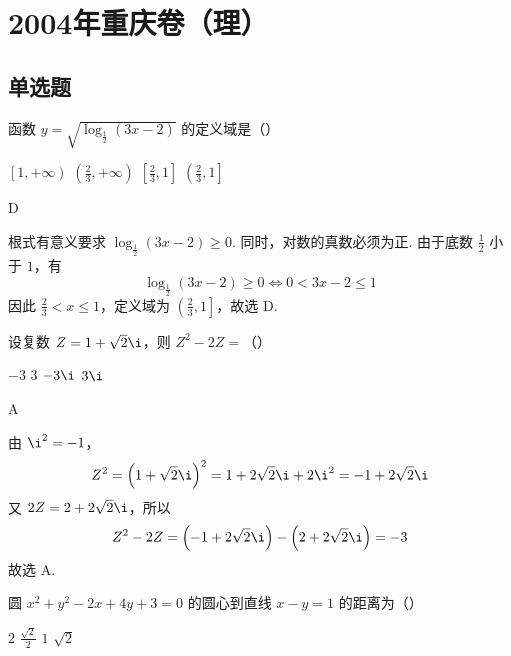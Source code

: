 
\chapter{2004年重庆卷（理）}
\section{单选题}
\begin{problem}
函数 \(y=\sqrt{\log_{\frac{1}{2}}(3x-2)}\) 的定义域是（\quad）

\choices
    {\(\left[1,+\infty\right)\)}
    {\(\left(\frac{2}{3},+\infty\right)\)}
    {\(\left[\frac{2}{3},1\right]\)}
    {\(\left(\frac{2}{3},1\right]\)}
\end{problem}

\begin{answer}
D
\end{answer}

\begin{solution}
根式有意义要求 \(\log_{\frac{1}{2}}(3x-2)\geqslant0\). 同时，对数的真数必须为正. 由于底数 \(\frac{1}{2}\) 小于 \(1\)，有
\[
\log_{\frac{1}{2}}(3x-2)\geqslant0\Longleftrightarrow 0<3x-2\leqslant1\]
因此 \(\frac{2}{3}<x\leqslant1\)，定义域为 \(\left(\frac{2}{3},1\right]\)，故选 D.
\end{solution}

\begin{problem}
设复数 \(Z=1+\sqrt{2}\i\)，则 \(Z^2-2Z=\)（\quad）

\choices
    {\(-3\)}
    {\(3\)}
    {\(-3\i\)}
    {\(3\i\)}
\end{problem}

\begin{answer}
A
\end{answer}

\begin{solution}
由 \(\i^2=-1\)，
\[
Z^2=\left(1+\sqrt{2}\i\right)^2=1+2\sqrt{2}\i+2\i^2=-1+2\sqrt{2}\i\]
又 \(2Z=2+2\sqrt{2}\i\)，所以
\[
Z^2-2Z=\left(-1+2\sqrt{2}\i\right)-\left(2+2\sqrt{2}\i\right)=-3\]
故选 A.
\end{solution}

\begin{problem}
圆 \(x^2+y^2-2x+4y+3=0\) 的圆心到直线 \(x-y=1\) 的距离为（\quad）

\choices
    {\(2\)}
    {\(\frac{\sqrt{2}}{2}\)}
    {\(1\)}
    {\(\sqrt{2}\)}
\end{problem}

